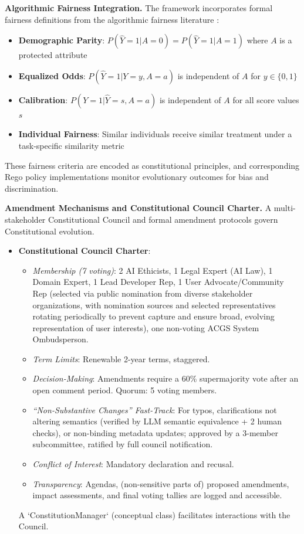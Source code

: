 \documentclass[manuscript,screen,review,anonymous,9pt]{acmart}
\begin{document}
\textbf{Algorithmic Fairness Integration.} The framework incorporates formal fairness definitions from the algorithmic fairness literature \cite{Barocas2023FairnessML, Hardt2016EqualityOpportunity, Chouldechova2017FairPrediction, Dwork2012DifferentialPrivacy}:

\begin{itemize}
	\item \textbf{Demographic Parity}: $P(\hat{Y} = 1 | A = 0) = P(\hat{Y} = 1 | A = 1)$ where $A$ is a protected attribute
	\item \textbf{Equalized Odds}: $P(\hat{Y} = 1 | Y = y, A = a)$ is independent of $A$ for $y \in \{0,1\}$
	\item \textbf{Calibration}: $P(Y = 1 | \hat{Y} = s, A = a)$ is independent of $A$ for all score values $s$
	\item \textbf{Individual Fairness}: Similar individuals receive similar treatment under a task-specific similarity metric
\end{itemize}

These fairness criteria are encoded as constitutional principles, and corresponding Rego policy implementations monitor evolutionary outcomes for bias and discrimination.

\textbf{Amendment Mechanisms and Constitutional Council Charter.} A multi-stakeholder Constitutional Council and formal amendment protocols govern Constitutional evolution.
\begin{itemize}
	\item \textbf{Constitutional Council Charter}:
	      \begin{itemize}
		      \item \textit{Membership (7 voting)}: 2 AI Ethicists, 1 Legal Expert (AI Law), 1 Domain Expert, 1 Lead Developer Rep, 1 User Advocate/Community Rep (selected via public nomination from diverse stakeholder organizations, with nomination sources and selected representatives rotating periodically to prevent capture and ensure broad, evolving representation of user interests), one non-voting ACGS System Ombudsperson.
		      \item \textit{Term Limits}: Renewable 2-year terms, staggered.
		      \item \textit{Decision-Making}: Amendments require a 60\% supermajority vote after an open comment period. Quorum: 5 voting members.
		      \item \textit{``Non-Substantive Changes'' Fast-Track}: For typos, clarifications not altering semantics (verified by LLM semantic equivalence + 2 human checks), or non-binding metadata updates; approved by a 3-member subcommittee, ratified by full council notification.
		      \item \textit{Conflict of Interest}: Mandatory declaration and recusal.
		      \item \textit{Transparency}: Agendas, (non-sensitive parts of) proposed amendments, impact assessments, and final voting tallies are logged and accessible.
	      \end{itemize}
	      A `ConstitutionManager` (conceptual class) facilitates interactions with the Council.
\end{itemize}
\end{document}
